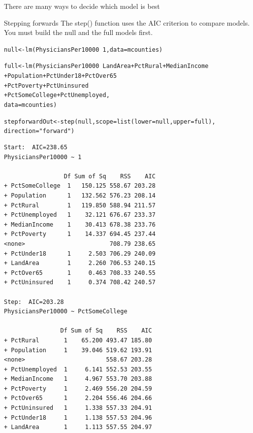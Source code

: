 \documentclass{beamer}\usepackage[]{graphicx}\usepackage[]{color}
\makeatletter
\newcommand{\hlnum}[1]{\textcolor[rgb]{0.824,0.412,0.118}{#1}}%
\newcommand{\hlstr}[1]{\textcolor[rgb]{1,0.894,0.71}{#1}}%
\newcommand{\hlopt}[1]{\textcolor[rgb]{1,0.894,0.769}{#1}}%
\newcommand{\hlstd}[1]{\textcolor[rgb]{1,0.894,0.769}{#1}}%
\newcommand{\hlkwb}[1]{\textcolor[rgb]{0.804,0.776,0.451}{#1}}%
\newcommand{\hlkwc}[1]{\textcolor[rgb]{0.78,0.941,0.545}{#1}}%
\newcommand{\hlkwd}[1]{\textcolor[rgb]{1,0.78,0.769}{#1}}%
\newenvironment{kframe}{%
 \def\at@end@of@kframe{}%
 \ifinner\ifhmode%
  \def\at@end@of@kframe{\end{minipage}}%
  \begin{minipage}{\columnwidth}%
 \fi\fi%
 \def\FrameCommand##1{\hskip\@totalleftmargin \hskip-\fboxsep
 \colorbox{shadecolor}{##1}\hskip-\fboxsep
     \hskip-\linewidth \hskip-\@totalleftmargin \hskip\columnwidth}%
 \MakeFramed {\advance\hsize-\width
   \@totalleftmargin\z@ \linewidth\hsize
   \@setminipage}}%
 {\par\unskip\endMakeFramed%
 \at@end@of@kframe}
\newenvironment{knitrout}{}{} %
\makeatother
\begin{document}
\begin{darkframes}
\begin{frame}[fragile]{There are many ways to decide which model is best}
      \lc  
    \end{frame}  

    \begin{frame}[fragile]{Stepping forwards}
      \fontsize{8}{8}\selectfont
       The step() function uses the AIC criterion to compare models. You must build the null and the full models first.

\begin{knitrout}
\begin{kframe}
\begin{alltt}
\hlstd{null} \hlkwb{<-} \hlkwd{lm}\hlstd{(PhysiciansPer10000}\hlopt{~}\hlnum{1}\hlstd{,} \hlkwc{data}\hlstd{=mcounties)}

\hlstd{full} \hlkwb{<-} \hlkwd{lm}\hlstd{(PhysiciansPer10000} \hlopt{~} \hlstd{LandArea} \hlopt{+} \hlstd{PctRural} \hlopt{+} \hlstd{MedianIncome}
                              \hlopt{+} \hlstd{Population} \hlopt{+} \hlstd{PctUnder18} \hlopt{+} \hlstd{PctOver65}
                              \hlopt{+} \hlstd{PctPoverty} \hlopt{+} \hlstd{PctUninsured}
                              \hlopt{+} \hlstd{PctSomeCollege} \hlopt{+} \hlstd{PctUnemployed,}
                              \hlkwc{data}\hlstd{=mcounties)}

\hlstd{stepforwardOut} \hlkwb{<-} \hlkwd{step}\hlstd{(null,} \hlkwc{scope}\hlstd{=}\hlkwd{list}\hlstd{(}\hlkwc{lower}\hlstd{=null,} \hlkwc{upper}\hlstd{=full),}
                             \hlkwc{direction} \hlstd{=}\hlstr{"forward"}\hlstd{)}
\end{alltt}
\begin{verbatim}
Start:  AIC=238.65
PhysiciansPer10000 ~ 1

                 Df Sum of Sq    RSS    AIC
+ PctSomeCollege  1   150.125 558.67 203.28
+ Population      1   132.562 576.23 208.14
+ PctRural        1   119.850 588.94 211.57
+ PctUnemployed   1    32.121 676.67 233.37
+ MedianIncome    1    30.413 678.38 233.76
+ PctPoverty      1    14.337 694.45 237.44
<none>                        708.79 238.65
+ PctUnder18      1     2.503 706.29 240.09
+ LandArea        1     2.260 706.53 240.15
+ PctOver65       1     0.463 708.33 240.55
+ PctUninsured    1     0.374 708.42 240.57

Step:  AIC=203.28
PhysiciansPer10000 ~ PctSomeCollege

                Df Sum of Sq    RSS    AIC
+ PctRural       1    65.200 493.47 185.80
+ Population     1    39.046 519.62 193.91
<none>                       558.67 203.28
+ PctUnemployed  1     6.141 552.53 203.55
+ MedianIncome   1     4.967 553.70 203.88
+ PctPoverty     1     2.469 556.20 204.59
+ PctOver65      1     2.204 556.46 204.66
+ PctUninsured   1     1.338 557.33 204.91
+ PctUnder18     1     1.138 557.53 204.96
+ LandArea       1     1.113 557.55 204.97


\end{verbatim}
\end{kframe}
\end{knitrout}
\end{frame}
\end{darkframes}
\end{document}
